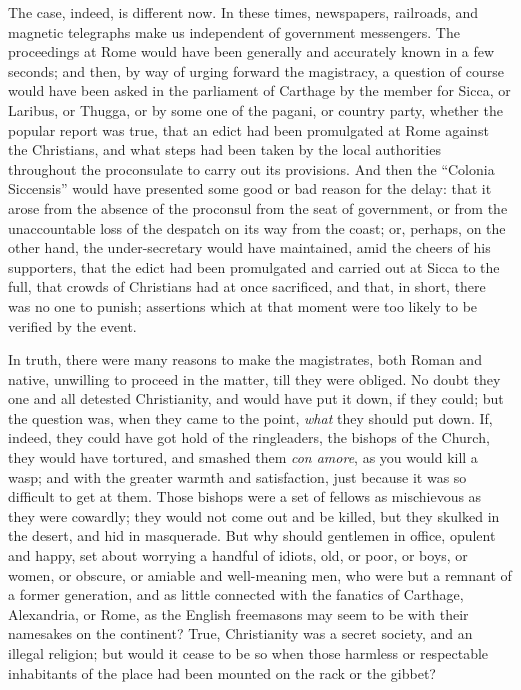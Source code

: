 The case, indeed, is different now. In these times, newspapers,
railroads, and magnetic telegraphs make us independent of government
messengers. The proceedings at Rome would have been generally and
accurately known in a few seconds; and then, by way of urging forward
the magistracy, a question of course would have been asked in the
parliament of Carthage by the member for Sicca, or Laribus, or Thugga,
or by some one of the pagani, or country party, whether the popular
report was true, that an edict had been promulgated at Rome against
the Christians, and what steps had been taken by the local authorities
throughout the proconsulate to carry out its provisions. And then the
``Colonia Siccensis'' would have presented some good or bad
reason for the delay: that it arose from the absence of the proconsul
from the seat of government, or from the unaccountable loss of the
despatch on its way from the coast; or, perhaps, on the other hand,
the under-secretary would have maintained, amid the cheers of his
supporters, that the edict had been promulgated and carried out at
Sicca to the full, that crowds of Christians had at once sacrificed,
and that, in short, there was no one to punish; assertions which at
that moment were too likely to be verified by the event.

In truth, there were many reasons to make the magistrates, both
Roman and native, unwilling to proceed in the matter, till they were
obliged. No doubt they one and all detested Christianity, and would
have put it down, if they could; but the question was, when they came
to the point, \emph{what} they should put down. If, indeed, they could
have got hold of the ringleaders, the bishops of the Church, they
would have tortured, and smashed them \emph{con amore}, as you would
kill a wasp; and with the greater warmth and satisfaction, just
because it was so difficult to get at them. Those bishops were a
set of fellows as mischievous as they were cowardly; they would not
come out and be killed, but they skulked in the desert, and hid in
masquerade. But why should gentlemen in office, opulent and happy, set
about worrying a handful of idiots, old, or poor, or boys, or women,
or obscure, or amiable and well-meaning men, who were but a remnant of
a former generation, and as little connected with the fanatics of
Carthage, Alexandria, or Rome, as the English freemasons may seem to
be with their namesakes on the continent? True, Christianity was a
secret society, and an illegal religion; but would it cease to be so
when those harmless or respectable inhabitants of the place had been
mounted on the rack or the gibbet?

